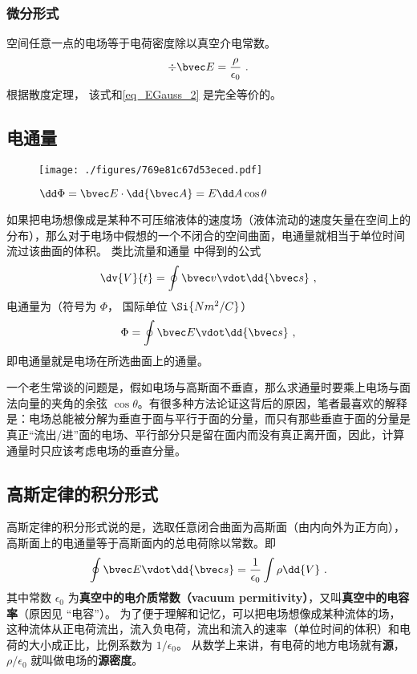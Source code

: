 \subsubsection{微分形式}
空间任意一点的电场等于电荷密度除以真空介电常数。
\begin{equation}\label{eq_EGauss_1}
\div \bvec E = \frac{\rho}{\epsilon_0}~.
\end{equation}
根据散度定理， 该式和\autoref{eq_EGauss_2} 是完全等价的。

\subsection{电通量}
\begin{figure}[ht]
\centering
\texttt{[image: ./figures/769e81c67d53eced.pdf]}
\caption{$\dd \Phi = \bvec E \cdot \dd {\bvec A} = E \dd A \cos \theta$} \label{fig_EGauss1}
\end{figure}
如果把电场想像成是某种不可压缩液体的速度场（液体流动的速度矢量在空间上的分布），那么对于电场中假想的一个不闭合的空间曲面，电通量就相当于单位时间流过该曲面的体积。
类比流量和通量%
中得到的公式
\begin{equation}
\dv{V}{t} = \oint \bvec v \vdot \dd{\bvec s}~,
\end{equation} 
电通量为（符号为 $\Phi $， 国际单位 $\Si{N m^2/C}$）
\begin{equation}
\Phi  = \oint \bvec E \vdot \dd{\bvec s}~,
\end{equation} 
即电通量就是电场在所选曲面上的通量。

一个老生常谈的问题是，假如电场与高斯面不垂直，那么求通量时要乘上电场与面法向量的夹角的余弦 $\cos \theta$。有很多种方法论证这背后的原因，笔者最喜欢的解释是：电场总能被分解为垂直于面与平行于面的分量，而只有那些垂直于面的分量是真正“流出/进”面的电场、平行部分只是留在面内而没有真正离开面，因此，计算通量时只应该考虑电场的垂直分量。

\subsection{高斯定律的积分形式}

高斯定律的积分形式说的是，选取任意闭合曲面为高斯面（由内向外为正方向），高斯面上的电通量等于高斯面内的总电荷除以常数。即
\begin{equation}\label{eq_EGauss_5}
\oint \bvec E \vdot \dd{\bvec s}  = \frac{1}{\epsilon_0} \int \rho \dd{V}~.
\end{equation} 
其中常数 $\epsilon_0$ 为\textbf{真空中的电介质常数（vacuum permitivity）}，又叫\textbf{真空中的电容率}（原因见 “电容”）。 为了便于理解和记忆，可以把电场想像成某种流体的场，这种流体从正电荷流出，流入负电荷，流出和流入的速率（单位时间的体积）和电荷的大小成正比，比例系数为 $1/\epsilon_0$。 从数学上来讲，有电荷的地方电场就有\textbf{源}， $\rho /\epsilon_0$ 就叫做电场的\textbf{源密度}。

